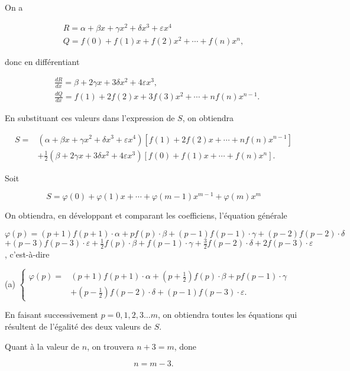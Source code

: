 \documentclass{article}
\begin{document}
On a

\[
\begin{gathered}
R=\alpha+\beta x+\gamma x^{2}+\delta x^{3}+\varepsilon x^{4} \\
Q=f(0)+f(1) x+f(2) x^{2}+\cdots+f(n) x^{n},
\end{gathered}
\]

donc en différentiant

\[
\begin{aligned}
& \frac{d R}{d x}=\beta+2 \gamma x+3 \delta x^{2}+4 \varepsilon x^{3}, \\
& \frac{d Q}{d x}=f(1)+2 f(2) x+3 f(3) x^{2}+\cdots+n f(n) x^{n-1} .
\end{aligned}
\]

En substituant ces valeurs dans l'expression de \(S\), on obtiendra

\[
\begin{aligned}
S= & \left(\alpha+\beta x+\gamma x^{2}+\delta x^{3}+\varepsilon x^{4}\right)\left[f(1)+2 f(2) x+\cdots+n f(n) x^{n-1}\right] \\
& +\frac{1}{2}\left(\beta+2 \gamma x+3 \delta x^{2}+4 \varepsilon x^{3}\right)\left[f(0)+f(1) x+\cdots+f(n) x^{n}\right] .
\end{aligned}
\]

Soit

\[
S=\varphi(0)+\varphi(1) x+\cdots+\varphi(m-1) x^{m-1}+\varphi(m) x^{m}
\]

On obtiendra, en développant et comparant les coefficiens, l'équation générale

\(\varphi(p)=(p+1) f(p+1) \cdot \alpha+p f(p) \cdot \beta+(p-1) f(p-1) \cdot \gamma+(p-2) f(p-2) \cdot \delta\) \(+(p-3) f(p-3) \cdot \varepsilon+\frac{1}{2} f(p) \cdot \beta+f(p-1) \cdot \gamma+\frac{3}{2} f(p-2) \cdot \delta+2 f(p-3) \cdot \varepsilon\), c'est-à-dire

(a) \(\left\{\begin{aligned} \varphi(p)= & (p+1) f(p+1) \cdot \alpha+\left(p+\frac{1}{2}\right) f(p) \cdot \beta+p f(p-1) \cdot \gamma \\ & +\left(p-\frac{1}{2}\right) f(p-2) \cdot \delta+(p-1) f(p-3) \cdot \varepsilon .\end{aligned}\right.\)

En faisant successivement \(p=0,1,2,3 \ldots m\), on obtiendra toutes les équations qui résultent de l'égalité des deux valeurs de \(S\).

Quant à la valeur de \(n\), on trouvera \(n+3=m\), done

\[
n=m-3 .
\]
\end{document}
